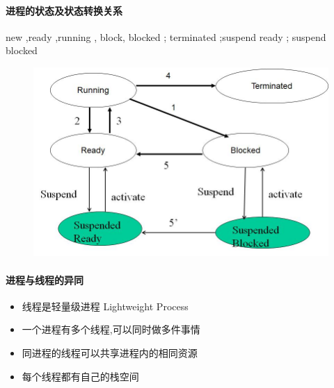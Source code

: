\documentclass[UTF8,a4paper]{ctexart}
\begin{document}
\paragraph{进程的状态及状态转换关系} new ,ready ,running , block, blocked ; terminated ;suspend ready ; suspend blocked

\begin{figure}[H]
	\centering
	\includegraphics[scale = 0.3]{assets/ModernOperatingSystems_ef0b3.png}
\end{figure}

\paragraph{进程与线程的异同}
\begin{itemize}
	\item 线程是轻量级进程 Lightweight Process
	\item 一个进程有多个线程,可以同时做多件事情
	\item 同进程的线程可以共享进程内的相同资源
	\item 每个线程都有自己的栈空间
\end{itemize}
\end{document}
